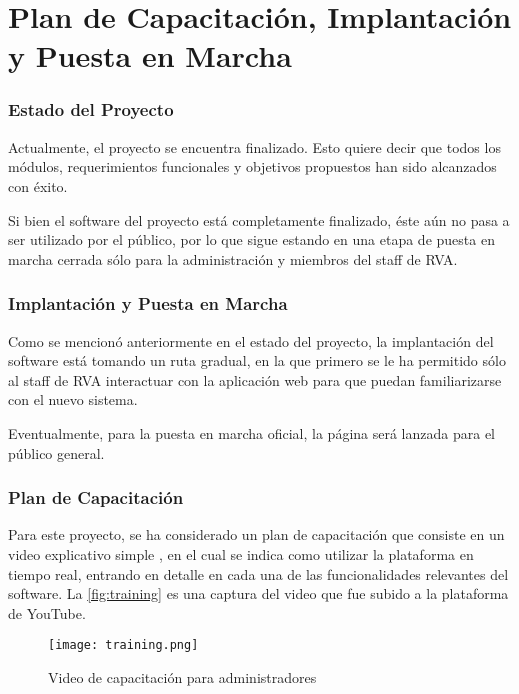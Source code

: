 \chapter{Plan de Capacitación, Implantación y Puesta en Marcha}

\subsection{Estado del Proyecto}
Actualmente, el proyecto se encuentra finalizado. Esto quiere decir que todos los módulos, requerimientos funcionales y objetivos propuestos han sido alcanzados con éxito.

Si bien el software del proyecto está completamente finalizado, éste aún no pasa a ser utilizado por el público, por lo que sigue estando en una etapa de puesta en marcha cerrada sólo para la administración y miembros del staff de RVA.

\subsection{Implantación y Puesta en Marcha}
Como se mencionó anteriormente en el estado del proyecto, la implantación del software está tomando un ruta gradual, en la que primero se le ha permitido sólo al staff de RVA interactuar con la aplicación web para que puedan familiarizarse con el nuevo sistema.

Eventualmente, para la puesta en marcha oficial, la página será lanzada para el público general.

\subsection{Plan de Capacitación}
Para este proyecto, se ha considerado un plan de capacitación que consiste en un video explicativo simple \cite{adminwalkthrough}, en el cual se indica como utilizar la plataforma en tiempo real, entrando en detalle en cada una de las funcionalidades relevantes del software. La \autoref{fig:training} es una captura del video que fue subido a la plataforma de YouTube.

\begin{figure}[H]
  \begin{center}
    \texttt{[image: training.png]}
  \end{center}
  \caption[Video de capacitación para administradores]{Video de capacitación para administradores}
  \label{fig:training}
\end{figure}
